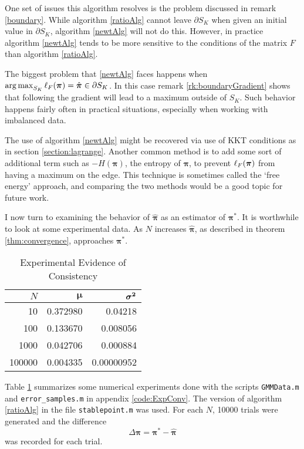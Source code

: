 One set of issues this algorithm resolves is the problem discussed in remark \ref{boundary}.  While algorithm \ref{ratioAlg} cannot leave $\partial S_K$ when given an initial value in $\partial S_K$, algorithm \ref{newtAlg} will not do this.  However, in practice algorithm \ref{newtAlg} tends to be more sensitive to the conditions of the matrix $F$ than algorithm \ref{ratioAlg}. 

The biggest problem that \ref{newtAlg} faces happens when \( \operatorname*{arg\,max}_{S_K} \ell_{F}({\bm\pi}) = \hat{\bm\pi} \in \partial S_K\). In this case remark \ref{rk:boundaryGradient} shows that following the gradient will lead to a maximum outside of \( S_K \).  Such behavior happens fairly often in practical situations, especially when working with imbalanced data.  

The use of algorithm \ref{newtAlg} might be recovered via use of KKT conditions as in section \ref{section:lagrange}.  Another common method is to add some sort of additional term such as \( -H(\bm\pi) \), the entropy of  \( \bm\pi \), to prevent \( \ell_{F}({\bm\pi}) \) from having a maximum on the edge.  This technique is sometimes called the `free energy' approach, and comparing the two methods would be a good topic for future work.


I now turn to examining the behavior of $\hat{\bm\pi}$ as an estimator of $\bm\pi^\ast$. It is worthwhile to look at some experimental data. As $N$ increases $\hat{\bm\pi}$, as described in theorem \ref{thm:convergence}, approaches $\bm\pi^\ast$.

\begin{table}[h]
\centering
\begin{tabular}{r||r|r}
\toprule
\textbf{$N$} & \textbf{$\bm \mu$} & \textbf{$\bm{\sigma^2}$}\\
\midrule
10 & 0.372980 & 0.04218\\
100 & 0.133670 & 0.008056\\
1000 & 0.042706 & 0.000884 \\
100000 & 0.004335 & 0.00000952\\
\bottomrule
\end{tabular}
\caption{Experimental Evidence of Consistency}
\label{exprConsist}
\end{table}

Table \ref{exprConsist} summarizes some numerical experiments done with the scripts  \verb|GMMData.m| and \verb|error_samples.m| in appendix \ref{code:ExpConv}. The version of  algorithm \ref{ratioAlg} in the file \verb|stablepoint.m| was used. For each $N$, 10000 trials were generated and the difference 
\[\Delta\bm\pi=\bm\pi^\ast-\hat{\bm\pi}\]
was recorded for each trial.  

